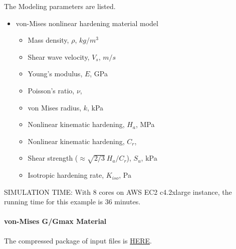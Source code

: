 The Modeling parameters are listed.
\begin{itemize}
  \item von-Mises nonlinear hardening material model 
  \begin{itemize}
    \item Mass density, $\rho$, \enspace {} $kg/m^3$
    \item Shear wave velocity, $V_s$, \enspace {} $m/s$
    \item Young's modulus, $E$, \enspace {} GPa
    \item Poisson's ratio, $\nu$, \enspace {}
    \item von Mises radius, $k$, \enspace {} kPa
    \item Nonlinear kinematic hardening, $H_a$, \enspace {} MPa
    \item Nonlinear kinematic hardening, $C_r$, \enspace {}
    \item Shear strength ($\approx \sqrt{2/3}\ {H_a/C_r} $), $S_u$, \enspace {} kPa
    \item Isotropic hardening rate, $K_{iso}$, \enspace {} Pa
  \end{itemize}
\end{itemize}


SIMULATION TIME: With 8 cores on AWS EC2 c4.2xlarge instance, the running time for this example is 36 minutes.


\paragraph{von-Mises G/Gmax Material}
The compressed package of input files is  
\href{http://sokocalo.engr.ucdavis.edu/~jeremic/lecture_notes_online_material/_Chapter_Short_Course_Examples/nonlinear_analysis_steps/soil-foundation/vonMisesGoverGmax/_all_files_packaged_for_vonMisesGoverGmax.tar.gz}{HERE}. 

